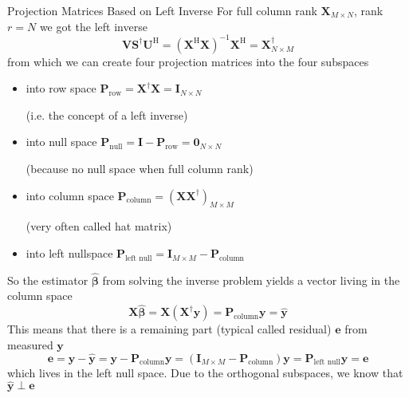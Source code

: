 \documentclass[mathserif, aspectratio=43]{intbeamer}
\begin{document}
\begin{frame}{Projection Matrices Based on Left Inverse}
For full column rank $\bm{X}_{M \times N}$, rank $r=N$ we got the left inverse
$$\bm{V} \bm{S}^\dagger\bm{U}^\mathrm{H} = (\bm{X}^\mathrm{H}\bm{X})^{-1} \bm{X}^\mathrm{H} = \bm{X}^\dagger_{N \times M}$$
from which we can create four projection matrices into the four subspaces
\begin{itemize}
\item into row space $\bm{P}_\text{row} = \bm{X}^\dagger \bm{X} = \bm{I}_{N \times N}$ \begin{footnotesize}(i.e. the concept of a left inverse)\end{footnotesize}
\item into null space $\bm{P}_\text{null} = \bm{I} - \bm{P}_\text{row} = \bm{0}_{N \times N}$ \begin{footnotesize}(because no null space when full column rank)\end{footnotesize}
\item into column space $\bm{P}_\text{column} = (\bm{X} \bm{X}^\dagger)_{M \times M}$ \begin{footnotesize}(very often called hat matrix)\end{footnotesize}
\item into left nullspace $\bm{P}_\text{left null} = \bm{I}_{M \times M} - \bm{P}_\text{column}$
\end{itemize}

So the estimator $\hat{\bm{\beta}}$ from solving the inverse problem yields a vector living in the column space
$$\bm{X} \hat{\bm{\beta}} = \bm{X} (\bm{X}^\dagger \bm{y}) = \bm{P}_\text{column} \bm{y} = \hat{\bm{y}}$$
This means that there is a remaining part (typical called residual) $\bm{e}$ from measured $\bm{y}$
$$\bm{e} = \bm{y} - \hat{\bm{y}} = \bm{y} - \bm{P}_\text{column} \bm{y} = (\bm{I}_{M \times M} - \bm{P}_\text{column}) \bm{y}=
\bm{P}_\text{left null} \bm{y} = \bm{e}$$
which lives in the left null space. Due to the orthogonal subspaces, we know that $\hat{\bm{y}} \perp \bm{e}$

\end{frame}
\end{document}
